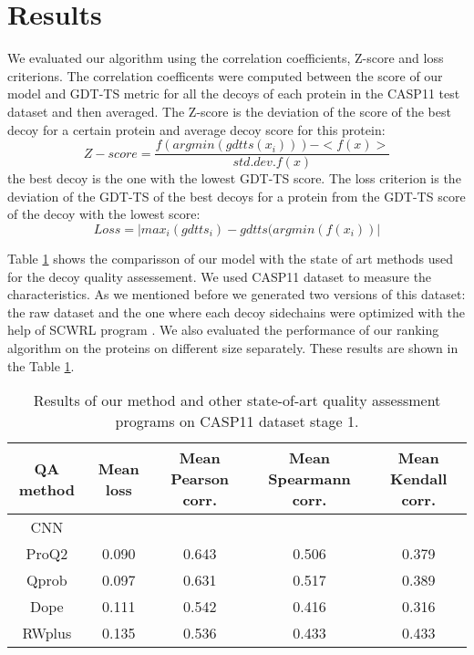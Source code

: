 \documentclass[a4paper,10pt]{article}
\begin{document}
\section{Results}
We evaluated our algorithm using the correlation coefficients, Z-score and loss criterions. The correlation coefficents were computed between the score of 
our model and GDT-TS metric for all the decoys of each protein in the CASP11 test dataset and then averaged. The Z-score is the deviation of the score of 
the best decoy for a certain protein and average decoy score for this protein:
$$ 
Z-score = \frac{f( argmin(gdtts(x_i)) ) - <f(x)>}{std.dev.f(x)}
$$ 
the best decoy is the one with the lowest GDT-TS score. 
The loss criterion is the deviation of the GDT-TS of the best decoys for a protein from the GDT-TS score of the decoy with the lowest score:
$$ 
Loss = | max_i( gdtts_i ) - gdtts( argmin(f(x_i) ) |
$$ 

Table \ref{} shows the comparisson of our model with the state of art methods used for the decoy quality assessement. We used CASP11 dataset to measure the 
characteristics. As we mentioned before we generated two versions of this dataset: the raw dataset and the one where each decoy sidechains were optimized with 
the help of SCWRL program \cite{}. We also evaluated the performance of our ranking algorithm on the proteins on different size separately. These results are shown 
in the Table \ref{}. 

\begin{table}[H]
\begin{center}
\begin{tabular}{ c | c | c | c | c }
    
    QA method & Mean loss & Mean Pearson corr. & Mean Spearmann corr. & Mean Kendall corr. \\
    \hline
    CNN     & & & & \\ \hline
    ProQ2   &0.090 &0.643 &0.506 &0.379 \\ \hline
    Qprob   &0.097 &0.631 &0.517 &0.389 \\ \hline
    Dope    &0.111 &0.542 &0.416 &0.316 \\ \hline
    RWplus  &0.135 &0.536 &0.433 &0.433 \\ \hline
\end{tabular}
    
    \caption {Results of our method and other state-of-art quality assessment programs on CASP11 dataset stage 1.}
    \label{Tbl:optParams}
\end{center}
\end{table}
\end{document}
